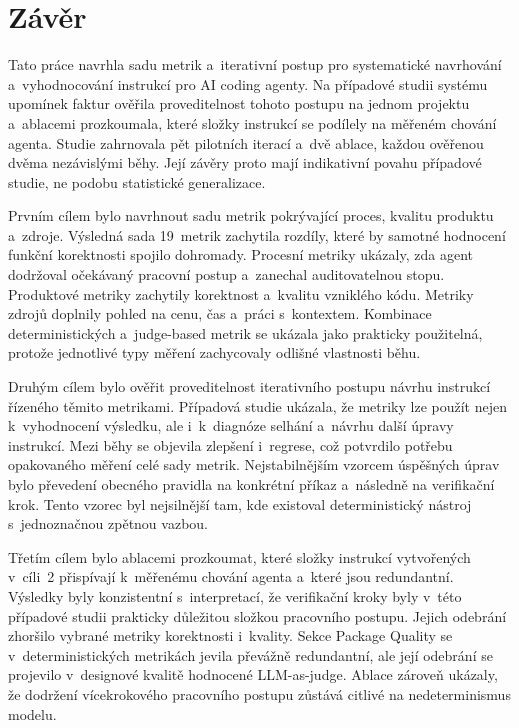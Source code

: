 \chapter*{Závěr}

Tato práce navrhla sadu metrik a~iterativní postup pro
systematické navrhování a~vyhodnocování instrukcí pro AI coding
agenty. Na případové studii systému upomínek faktur ověřila
proveditelnost tohoto postupu na jednom projektu a~ablacemi
prozkoumala, které složky instrukcí se podílely na měřeném chování
agenta. Studie zahrnovala pět pilotních iterací a~dvě ablace, každou
ověřenou dvěma nezávislými běhy. Její závěry proto mají indikativní
povahu případové studie, ne podobu statistické generalizace.

Prvním cílem bylo navrhnout sadu metrik pokrývající proces, kvalitu
produktu a~zdroje. Výsledná sada 19~metrik zachytila rozdíly, které
by samotné hodnocení funkční korektnosti spojilo dohromady. Procesní
metriky ukázaly, zda agent dodržoval očekávaný pracovní postup
a~zanechal auditovatelnou stopu. Produktové metriky zachytily
korektnost a~kvalitu vzniklého kódu. Metriky zdrojů doplnily pohled
na cenu, čas a~práci s~kontextem. Kombinace deterministických
a~judge-based metrik se ukázala jako prakticky použitelná, protože
jednotlivé typy měření zachycovaly odlišné vlastnosti běhu.

Druhým cílem bylo ověřit proveditelnost iterativního postupu návrhu
instrukcí řízeného těmito metrikami. Případová studie ukázala, že
metriky lze použít nejen k~vyhodnocení výsledku, ale i~k~diagnóze
selhání a~návrhu další úpravy instrukcí. Mezi běhy se objevila
zlepšení i~regrese, což potvrdilo potřebu opakovaného měření celé
sady metrik. Nejstabilnějším vzorcem úspěšných úprav bylo převedení
obecného pravidla na konkrétní příkaz a~následně na verifikační krok.
Tento vzorec byl nejsilnější tam, kde existoval deterministický
nástroj s~jednoznačnou zpětnou vazbou.

Třetím cílem bylo ablacemi prozkoumat, které složky instrukcí
vytvořených v~cíli~2 přispívají k~měřenému chování agenta a~které
jsou redundantní. Výsledky byly konzistentní s~interpretací, že
verifikační kroky byly v~této případové studii prakticky důležitou
složkou pracovního postupu. Jejich odebrání zhoršilo vybrané metriky
korektnosti i~kvality. Sekce Package Quality se v~deterministických
metrikách jevila převážně redundantní, ale její odebrání se projevilo
v~designové kvalitě hodnocené LLM-as-judge. Ablace zároveň ukázaly,
že dodržení vícekrokového pracovního postupu zůstává citlivé na
nedeterminismus modelu.

